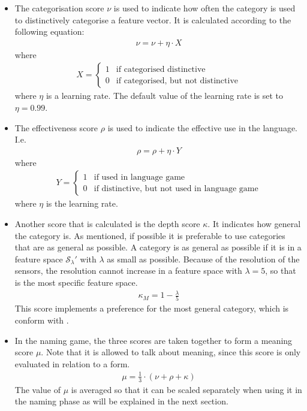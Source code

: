 \begin{itemize}
\item The categorisation score $\nu$ is used to indicate how often the category is used to distinctively categorise a feature vector. It is calculated according to the following equation:
\begin{eqnarray}
\nu = \nu + \eta \cdot X
\label{e:lg:nu}
\end{eqnarray}
where
\begin{eqnarray}
X = \left \{ \begin{array}{rl}
1 & \mbox{if categorised distinctive}\\\nonumber
0 & \mbox{if categorised, but not distinctive}\nonumber
\end{array} \right.
\end{eqnarray}
where $\eta$ is a learning rate. The default value of the learning rate is set to $\eta=0.99$.
 \item The effectiveness score $\rho$ is used to indicate the effective use in the language. I.e.
\begin{eqnarray}
\rho = \rho + \eta \cdot Y
\label{e:lg:rho}
\end{eqnarray}
where
\begin{eqnarray}
Y = \left \{ \begin{array}{rl}
1 & \mbox{if used in language game}\\\nonumber
0 & \mbox{if distinctive, but not used in language game}\nonumber
\end{array} \right.
\end{eqnarray}
where $\eta$ is the learning rate.
\item Another score that is calculated is the depth score $\kappa$. It indicates how general the category is. As mentioned, if possible it is preferable to use categories that are as general as possible. A category is as general as possible if it is in a feature space ${\mathcal S}_\lambda'$ with $\lambda$ as small as possible. Because of the resolution of the sensors, the resolution cannot increase in a feature space with $\lambda=5$, so that is the most specific feature space.
\begin{eqnarray}
\displaystyle
\kappa_M=1 - \frac{\lambda}{5}
\label{e:lg:kappa}
\end{eqnarray}
\noindent
This score implements a preference for the most general category, which is conform  with \citealt{steels:1996b}. 

\item In the naming game, the three scores are taken together to form a meaning score $\mu$. Note that it is allowed to talk about meaning, since this score is only evaluated in relation to a form.
\begin{eqnarray}
\displaystyle
\mu=\frac{1}{3}\cdot (\nu+\rho+\kappa)
\end{eqnarray}
\noindent
The value of $\mu$ is averaged so that it can be scaled separately when using it in the naming phase as will be explained in the next section.
\end{itemize}


